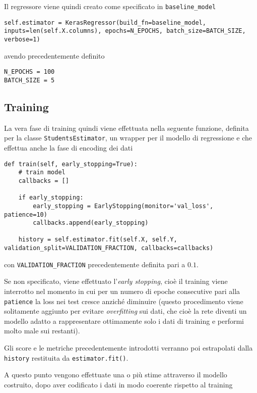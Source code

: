 Il regressore viene quindi creato come specificato in \lstinline{baseline_model}

\begin{verbatim}
self.estimator = KerasRegressor(build_fn=baseline_model, inputs=len(self.X.columns), epochs=N_EPOCHS, batch_size=BATCH_SIZE, verbose=1)
\end{verbatim}

\noindent
avendo precedentemente definito

\begin{verbatim}
N_EPOCHS = 100
BATCH_SIZE = 5
\end{verbatim}

\subsection{Training} %
\label{sub:methods_ml_training}

La vera fase di training quindi viene effettuata nella seguente funzione, definita per la classe 
\lstinline{StudentsEstimator}, un wrapper per il modello di regressione e che effettua anche la fase
di encoding dei dati

\begin{verbatim}
def train(self, early_stopping=True):
    # train model
    callbacks = []

    if early_stopping:
        early_stopping = EarlyStopping(monitor='val_loss', patience=10)
        callbacks.append(early_stopping)

    history = self.estimator.fit(self.X, self.Y, validation_split=VALIDATION_FRACTION, callbacks=callbacks)
\end{verbatim} 
\noindent
con \lstinline{VALIDATION_FRACTION} precedentemente definita pari a $0.1$. 

Se non specificato, viene effettuato l'\textit{early stopping}, cioè il training viene interrotto 
nel momento in cui per un numero di epoche consecutive pari alla \lstinline{patience} la loss nei test 
cresce anziché diminuire (questo procedimento viene solitamente aggiunto per evitare \textit{overfitting} 
sui dati, che cioè la rete diventi un modello adatto a rappresentare ottimamente solo i dati di training
e performi molto male sui restanti). 

Gli score e le metriche precedentemente introdotti verranno poi estrapolati dalla \lstinline{history} 
restituita da \lstinline{estimator.fit()}.

A questo punto vengono effettuate una o più stime attraverso il modello costruito, dopo aver codificato i 
dati in modo coerente rispetto al training

